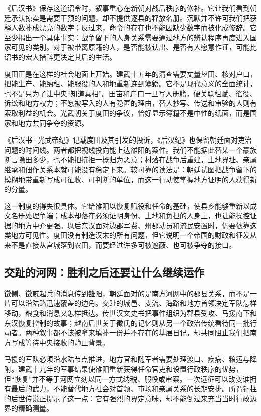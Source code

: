 《后汉书》保存这道诏令时，叙事重心在新朝对战后秩序的修补。它让我们看到朝廷承认掠卖是需要干预的问题，却不提供逐县的释放名册。沉默并不许可我们把获释人数补成漂亮的数字；反过来，命令的存在也不能因缺少数字而被化成修辞。它至少揭出一个具体事实：战争留下的人身关系需要通过地方的辨认程序再度进入国家可见的类别。对于被带离原籍的人，是否能被认出、是否有人愿意作证，可能比诏书的宏大措辞更决定其后的生活。

度田正是在这样的社会地面上开始。建武十五年的清查需要丈量垦田、核对户口，把能生产、能纳租、能服役的人和地重新连到簿籍。它不是现代意义的全面统计，也不是只为了让中央“知道真相”。田亩和户口一旦写入册籍，便关联租赋、徭役、诉讼和地方权力；不愿被写入的人有隐匿的理由，替人抄写、传送和审验的人则有索取利益的机会。光武朝关于度田的争议，恰好显示簿籍不是中性的纸面，而是国家和地方共同争夺的资源。

《后汉书·光武帝纪》记载度田及其引发的投诉，《后汉纪》也保留朝廷面对吏治问题的时间线。两者都把视线投向能上达雒阳的案件。我们不能据此替某一个豪族断言隐田多少，也不能把抗拒一概归为恶意；村落在战争后重建，土地界址、亲属继承和佃作关系本就可能没有稳定下来。较可靠的读法是：朝廷试图把战争留下的模糊地带重新写成可征收、可判断的单位，而这一行动使掌握地方证明的人获得新的分量。

这一制度的得失很具体。它给雒阳以恢复赋役和任命的基础，使县乡能够重新以成文名册处理争端；成本却落在必须证明身份、土地和负担的人身上，也让能操控证据的地方中介更强。以后东汉面对边郡军费、州郡动员和流民安置时，仍要依靠这类地方可见性。度田没有制造汉末的所有问题，但它说明一个帝国的财政和征发从来不是直接从宫城落到农田，而要经过许多可被遮蔽、也可被争夺的接口。

\subsection{交趾的河网：胜利之后还要让什么继续运作}

徵侧、徵贰起兵的消息传到雒阳，朝廷面对的是南方河网中的郡县关系，而不是一片可以沿陆路迅速覆盖的边角。交趾的城邑、支流、海路和地方首领决定军队怎样移动，粮食和消息又怎样抵达。传世汉文史书把事件组织为郡县受攻、马援南下和东汉恢复控制的故事；越南后世关于徵氏的记忆则从另一个政治传统看待同一批行动者。两种叙事都不该被拿来填补一份并不存在的基层日记，却共同阻止我们把南方写成等待中央接收的静止背景。

马援的军队必须沿水陆节点推进，地方官和随军者需要处理渡口、疾病、粮运与降附。建武十九年的军事结果使雒阳重新获得任命官吏和设置行政秩序的优势，但“恢复”并不等于河网立刻以同一方式纳税、服役或审案。一次远征可以改变谁拥有最后的武力，不能替代地方社会对首领、市场和亲属关系的长期安排。所谓铜柱的后世传说正提示了这一点：它有强烈的界定意味，却不能倒过来充当当时行政边界的精确测量。


